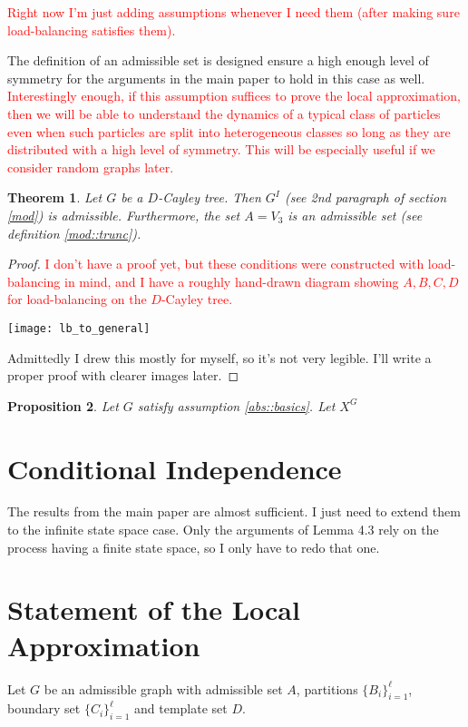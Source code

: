 \documentclass[12pt]{article}
\newcommand{\tr}{\textcolor{red}}
\newcommand{\inter}[1]{#1^I}
\renewcommand{\d}{D}
\newtheorem{thms}{Theorem}[section]
\newtheorem{prop}[thms]{Proposition}
\begin{document}
\tr{Right now I'm just adding assumptions whenever I need them (after making sure load-balancing satisfies them).}

The definition of an admissible set is designed ensure a high enough level of symmetry for the arguments in the main paper to hold in this case as well. \tr{Interestingly enough, if this assumption suffices to prove the local approximation, then we will be able to understand the dynamics of a typical class of particles even when such particles are split into heterogeneous classes so long as they are distributed with a high level of symmetry. This will be especially useful if we consider random graphs later.}

\begin{thms}
Let \(G\) be a \(\d\)-Cayley tree. Then \(\inter{G}\) (see 2nd paragraph of section \ref{mod}) is admissible. Furthermore, the set \(A = V_3\) is an admissible set (see definition \ref{mod::trunc}).
\end{thms}
\begin{proof}
\tr{I don't have a proof yet, but these conditions were constructed with load-balancing in mind, and I have a roughly hand-drawn diagram showing \(A,B,C,D\) for load-balancing on the \(\d\)-Cayley tree.}

\texttt{[image: lb\_to\_general]}

Admittedly I drew this mostly for myself, so it's not very legible. I'll write a proper proof with clearer images later.
\end{proof}

\begin{prop}
Let \(G\) satisfy assumption \ref{abs::basics}. Let \(X^G\)
\end{prop}


\section{Conditional Independence}
\label{CI}

The results from the main paper are almost sufficient. I just need to extend them to the infinite state space case. Only the arguments of Lemma 4.3 rely on the process having a finite state space, so I only have to redo that one.

\section{Statement of the Local Approximation}
\label{Main}

Let \(G\) be an admissible graph with admissible set \(A\), partitions \(\{B_i\}_{i=1}^\ell\), boundary set \(\{C_i\}_{i=1}^\ell\) and template set \(D\).
\end{document}

